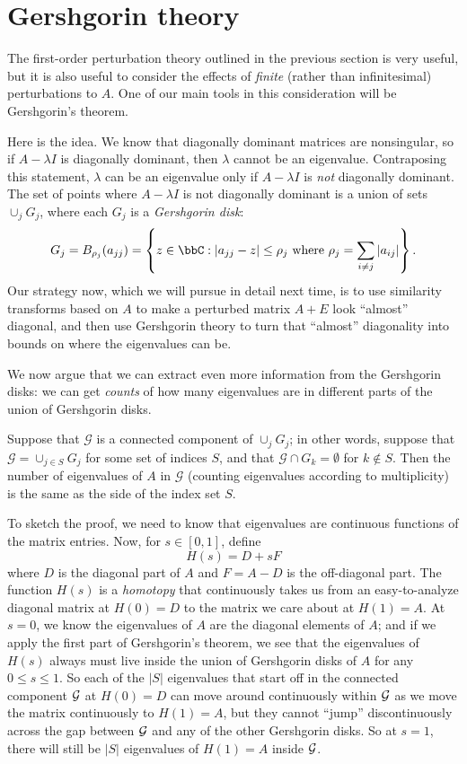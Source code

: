 \section{Gershgorin theory}

The first-order perturbation theory outlined in the previous section
is very useful, but it is also useful to consider the effects of
{\em finite} (rather than infinitesimal) perturbations to $A$.  One of
our main tools in this consideration will be Gershgorin's theorem.

Here is the idea.  We know that diagonally dominant matrices are nonsingular,
so if $A - \lambda I$ is diagonally dominant, then $\lambda$ cannot be an
eigenvalue.  Contraposing this statement, $\lambda$ can be an
eigenvalue only if $A - \lambda I$ is {\em not} diagonally dominant.
The set of points where $A - \lambda I$ is not diagonally dominant is
a union of sets $\cup_j G_j$, where each $G_j$ is a {\em Gershgorin disk}:
\[
  G_j = B_{\rho_j}(a_{jj}) =
  \left\{
    z \in \bbC : |a_{jj}-z| \leq \rho_j \mbox{ where }
    \rho_j = \sum_{i \neq j} |a_{ij}|
  \right\}.
\]
Our strategy now, which we will pursue in detail next time, is to use
similarity transforms based on $A$ to make a perturbed matrix $A+E$
look ``almost'' diagonal, and then use Gershgorin theory to turn that
``almost'' diagonality into bounds on where the eigenvalues can be.

We now argue that we can extract even more information from the
Gershgorin disks: we can get {\em counts} of how many eigenvalues
are in different parts of the union of Gershgorin disks.

Suppose that $\mathcal{G}$ is a connected component of $\cup_j G_j$;
in other words, suppose that $\mathcal{G} = \cup_{j \in S} G_j$ for
some set of indices $S$, and that $\mathcal{G} \cap G_k = \emptyset$
for $k \not \in S$.  Then the number of eigenvalues of $A$ in
$\mathcal{G}$ (counting eigenvalues according to multiplicity) is the
same as the side of the index set $S$.

To sketch the proof, we need to know that eigenvalues are continuous
functions of the matrix entries.  Now, for $s \in [0,1]$, define
\[
  H(s) = D + sF
\]
where $D$ is the diagonal part of $A$ and $F = A-D$ is the off-diagonal
part.  The function $H(s)$ is a {\em homotopy} that continuously takes
us from an easy-to-analyze diagonal matrix at $H(0) = D$ to the matrix
we care about at $H(1) = A$.  At $s = 0$, we know the eigenvalues of $A$
are the diagonal elements of $A$; and if we apply the first part of Gershgorin's
theorem, we see that the eigenvalues of $H(s)$ always must live inside
the union of Gershgorin disks of $A$ for any $0 \leq s \leq 1$.
So each of the $|S|$ eigenvalues that start off in the connected component
$\mathcal{G}$ at $H(0) = D$ can move around continuously within $\mathcal{G}$
as we move the matrix continuously to $H(1) = A$, but they cannot ``jump''
discontinuously across the gap between $\mathcal{G}$ and any of the other Gershgorin
disks.  So at $s = 1$, there will still be $|S|$ eigenvalues of $H(1) = A$
inside $\mathcal{G}$.
